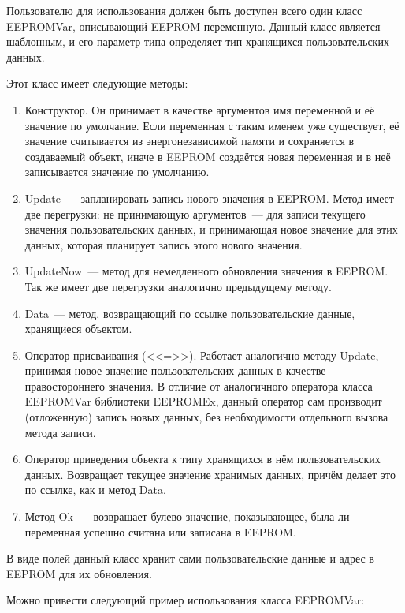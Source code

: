 Пользователю для использования должен быть доступен всего один класс EEPROMVar, описывающий EEPROM-переменную.
Данный класс является шаблонным, и его параметр типа определяет тип хранящихся пользовательских данных.

Этот класс имеет следующие методы:
\begin{enumerate}
	\item Конструктор. Он принимает в качестве аргументов имя переменной и её значение по умолчание.
	Если переменная с таким именем уже существует, её значение считывается из энергонезависимой памяти и сохраняется в создаваемый объект, иначе в EEPROM создаётся новая переменная и в неё записывается значение по умолчанию.
	\item Update~--- запланировать запись нового значения в EEPROM.
	Метод имеет две перегрузки: не принимающую аргументов~--- для записи текущего значения пользовательских данных, и принимающая новое значение для этих данных, которая планирует запись этого нового значения.
	\item UpdateNow~--- метод для немедленного обновления значения в EEPROM.
	Так же имеет две перегрузки аналогично предыдущему методу.
	\item Data~--- метод, возвращающий по ссылке пользовательские данные, хранящиеся объектом.
	\item Оператор присваивания (<<=>>).
	Работает аналогично методу Update, принимая новое значение пользовательских данных в качестве правостороннего значения.
	В отличие от аналогичного оператора класса EEPROMVar библиотеки EEPROMEx, данный оператор сам производит (отложенную) запись новых данных, без необходимости отдельного вызова метода записи.
	\item Оператор приведения объекта к типу хранящихся в нём пользовательских данных.
	Возвращает текущее значение хранимых данных, причём делает это по ссылке, как и метод Data.
	\item Метод Ok~--- возвращает булево значение, показывающее, была ли переменная успешно считана или записана в EEPROM.
\end{enumerate}

В виде полей данный класс хранит сами пользовательские данные и адрес в EEPROM для их обновления.

Можно привести следующий пример использования класса EEPROMVar:



